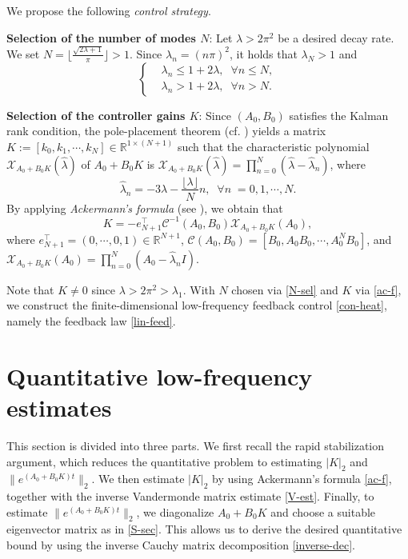 \documentclass[a4paper]{article}
\numberwithin{equation}{section}
\begin{document}
We propose the following \textit{control strategy}.

\noindent \textbf{Selection of the number of modes $N$}: Let $\lambda>2\pi^2$ be a desired decay rate. We set 
$N= \lfloor \frac{\sqrt{2\lambda+1}}{\pi}\rfloor>1$. Since $\lambda_n=(n\pi)^2$, it holds that $\lambda_N>1$ and
\begin{equation}\label{N-sel}\left\{\begin{aligned}
    &\lambda_n\le 1+ 2\lambda,\;\;\forall n\le N,\\
    &\lambda_n>1+2\lambda,\;\;\forall n>N.
\end{aligned}\right.
\end{equation}

\noindent \textbf{Selection of the controller gains $K$}: Since $ (A_0,B_0)$ satisfies the Kalman rank condition,  the pole-placement theorem (cf. \cite[Theorem 17]{Trelat}) yields a matrix $K:=[k_0,k_1,\cdots,k_N]\in \mathbb{R}^{1\times (N+1)}$ such that the characteristic polynomial $\mathcal{X} _{A_0+B_0K}(\hat{\lambda})$ of $A_0+B_0K$ is $\mathcal{X} _{A_0+B_0K}(\hat{\lambda})=\prod_{n=0}^N(\hat{\lambda}-\hat{\lambda}_n)$, where
\begin{equation} \label{hat-lambda}
\hat{\lambda}_n=-3\lambda-\frac{\lfloor \lambda\rfloor}{N}n,\;\;\forall n\;=0,1,\cdots,N.\end{equation}
By applying \textit{Ackermann's formula} (see \cite[Section 3.2]{TK}), we obtain that
\begin{equation}\label{ac-f}
	K=-e_{N+1}^\top \mathcal{C}^{-1}(A_0,B_0)\mathcal{X}_{A_0+B_0K}(A_0),
\end{equation}
where $e_{N+1}^\top=(0,\cdots,0,1)\in\mathbb{R}^{{N+1}}$, $\mathcal{C}(A_0,B_0)=[B_0,A_0B_0,\cdots,A_0^NB_0]$, and $\mathcal{X} _{A_0+B_0K}(A_0)=\prod\limits_{n=0}^N(A_0-\hat{\lambda}_nI).$

Note that $K\neq 0$ since $\lambda>2\pi^2>\lambda_1$. With $N$ chosen via \eqref{N-sel} and $K$ via \eqref{ac-f}, we construct the finite-dimensional low-frequency feedback control \eqref{con-heat}, namely the feedback law \eqref{lin-feed}.


\section{Quantitative low-frequency estimates}\label{estimate}
This section is divided into three parts. We first recall the rapid stabilization argument, which reduces the quantitative problem to estimating $|K|_2$ and $\|e^{(A_0+B_0K)t}\|_2$. We then estimate $|K|_2$ by using Ackermann's formula \eqref{ac-f}, together with the inverse Vandermonde matrix estimate \eqref{V-est}. Finally, to estimate $\|e^{(A_0+B_0K)t}\|_2$, we diagonalize $A_0+B_0K$ and choose a suitable eigenvector matrix as in \eqref{S-sec}. This allows us to derive the desired quantitative bound by using the inverse Cauchy matrix decomposition \eqref{inverse-dec}.
\end{document}
